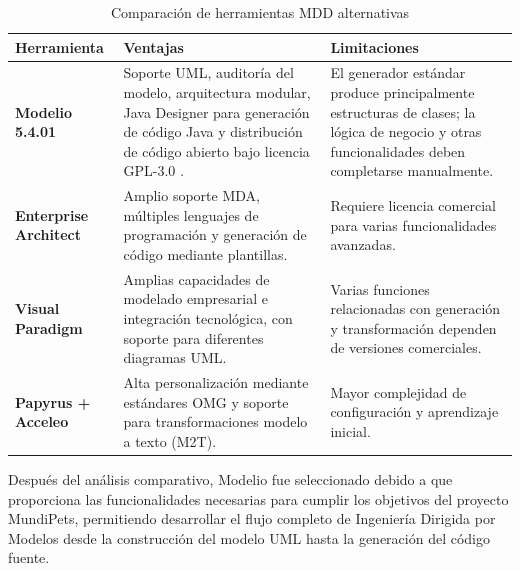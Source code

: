 \documentclass[10pt,a4paper,openany]{report}
\renewcommand{\arraystretch}{1.15}
\begin{document}
	\begin{table}[H]
		\centering
		\caption{Comparación de herramientas MDD alternativas}
		\label{tab:comparacion_herramientas}
		\renewcommand{\arraystretch}{1.3}
		
		\begin{tabular}{|p{3cm}|p{5cm}|p{5cm}|}
			\hline
			\textbf{Herramienta} & 
			\textbf{Ventajas} & 
			\textbf{Limitaciones} \\
			
			\hline
			
			\textbf{Modelio 5.4.01} &
			Soporte UML, auditoría del modelo, arquitectura modular, Java Designer
			para generación de código Java y distribución de código abierto bajo
			licencia GPL-3.0
			\cite{modelioOficial,modelioJavaDesigner,modelioLicencia}. &
			El generador estándar produce principalmente estructuras de clases; la
			lógica de negocio y otras funcionalidades deben completarse manualmente. \\
			
			\hline
			
			\textbf{Enterprise Architect} &
			Amplio soporte MDA, múltiples lenguajes de programación y generación de
			código mediante plantillas. &
			Requiere licencia comercial para varias funcionalidades avanzadas. \\
			
			\hline
			
			\textbf{Visual Paradigm} &
			Amplias capacidades de modelado empresarial e integración tecnológica,
			con soporte para diferentes diagramas UML. &
			Varias funciones relacionadas con generación y transformación dependen de
			versiones comerciales. \\
			
			\hline
			
			\textbf{Papyrus + Acceleo} &
			Alta personalización mediante estándares OMG y soporte para
			transformaciones modelo a texto (M2T). &
			Mayor complejidad de configuración y aprendizaje inicial. \\
			
			\hline
			
		\end{tabular}
		
	\end{table}
	Después del análisis comparativo, Modelio fue seleccionado debido a que 
	proporciona las funcionalidades necesarias para cumplir los objetivos del 
	proyecto MundiPets, permitiendo desarrollar el flujo completo de Ingeniería 
	Dirigida por Modelos desde la construcción del modelo UML hasta la generación 
	del código fuente.
	
\end{document}
